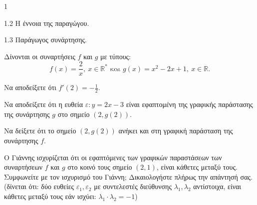 \begin{ylh}{1}
    \item 1.2 Η έννοια της παραγώγου.
    \item 1.3 Παράγωγος συνάρτησης.
\end{ylh}


Δίνονται οι συναρτήσεις $f$ και $g$ με τύπους:
\[ f(x) = \frac{2}{x}, \ x \in \mathbb{R}^* \text{ και } g(x) = x^2 - 2x + 1, \ x \in \mathbb{R}. \]

\begin{alist}
    \item Να αποδείξετε ότι $f'(2) = -\frac{1}{2}$. 
    
    \item Να αποδείξετε ότι η ευθεία $\varepsilon: y = 2x - 3$ είναι εφαπτομένη της γραφικής παράστασης της συνάρτησης $g$ στο σημείο $(2, g(2))$. 
    
    \item
    \begin{rlist}
        \item Να δείξετε ότι το σημείο $(2, g(2))$ ανήκει και στη γραφική παράσταση της συνάρτησης $f$. 
        
        \item Ο Γιάννης ισχυρίζεται ότι οι εφαπτόμενες των γραφικών παραστάσεων των συναρτήσεων $f$ και $g$ στο κοινό τους σημείο $(2,1)$, είναι κάθετες μεταξύ τους. Συμφωνείτε με τον ισχυρισμό του Γιάννη; Δικαιολογήστε πλήρως την απάντησή σας.\\
        (δίνεται ότι: δύο ευθείες $\varepsilon_1, \varepsilon_2$ με συντελεστές διεύθυνσης $\lambda_1, \lambda_2$ αντίστοιχα, είναι κάθετες μεταξύ τους εάν ισχύει: $\lambda_1 \cdot \lambda_2 = -1$) 
    \end{rlist}
\end{alist}

